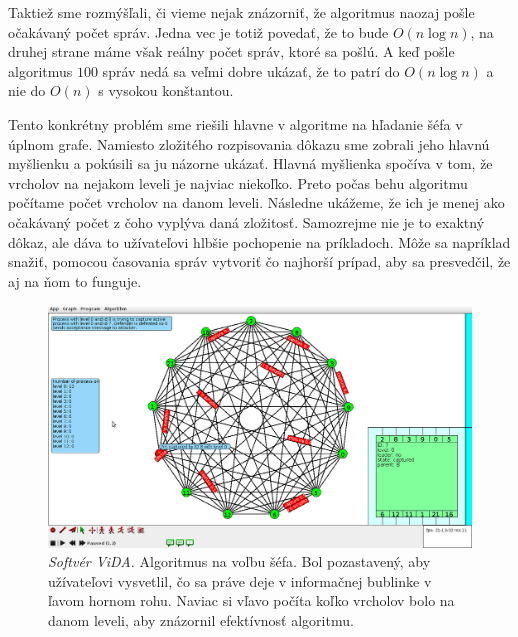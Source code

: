 Taktiež sme rozmýšľali, či vieme nejak znázorniť, že algoritmus naozaj pošle očakávaný počet správ.
Jedna vec je totiž povedať, že to bude $O(n\log n)$, na druhej strane máme však reálny počet správ,
ktoré sa pošlú. A keď pošle algoritmus $100$ správ nedá sa veľmi dobre ukázať, že to patrí do $O(n
\log n)$ a nie do $O(n)$ s vysokou konštantou.

Tento konkrétny problém sme riešili hlavne v algoritme na hľadanie šéfa v úplnom grafe. Namiesto
zložitého rozpisovania dôkazu sme zobrali jeho hlavnú myšlienku a pokúsili sa ju názorne ukázať.
Hlavná myšlienka spočíva v tom, že vrcholov na nejakom leveli je najviac niekoľko. Preto počas behu
algoritmu počítame počet vrcholov na danom leveli. Následne ukážeme, že ich je menej ako očakávaný
počet z čoho vyplýva daná zložitosť. Samozrejme nie je to exaktný dôkaz, ale dáva to užívateľovi
hlbšie pochopenie na príkladoch. Môže sa napríklad snažiť, pomocou časovania správ vytvoriť čo
najhorší prípad, aby sa
presvedčil, že aj na ňom to funguje.

\noindent
\begin{figure}
\centering
\includegraphics[width=2.01\columnwidth]{LE.png}
\caption{\emph{Softvér ViDA.} Algoritmus na voľbu šéfa. Bol pozastavený, aby užívateľovi
vysvetlil, čo sa práve deje v informačnej bublinke v ľavom hornom rohu. Naviac si vľavo počíta koľko
vrcholov bolo na danom leveli, aby znázornil efektívnosť algoritmu.}
\label{img:historia} 
\end{figure}
